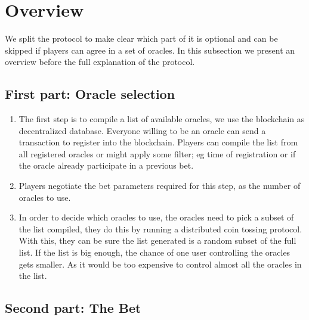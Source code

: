 \section{Overview}

We split the protocol to make clear which part of it is optional and can be
  skipped if players can agree in a set of oracles.
In this subsection we present an overview before the full explanation of the
  protocol.

\subsection{First part: Oracle selection}

\begin{enumerate}
  \item The first step is to compile a list of available oracles, we use the
      blockchain as decentralized database.
      Everyone willing to be an oracle can send a transaction to register into
      the blockchain.
      Players can compile the list from all registered oracles or might apply
      some filter; eg time of registration or if the oracle already participate
      in a previous bet.
  \item Players negotiate the bet parameters required for this step, as the
      number of oracles to use.
  \item In order to decide which oracles to use, the oracles need to pick a
      subset of the list compiled, they do this by running a distributed
      coin tossing protocol.
    With this, they can be sure the list generated is a random subset of the
      full list. If the list is big enough, the chance of one user controlling
      the oracles gets smaller. As it would be too expensive to control almost
      all the oracles in the list.
\end{enumerate}

\subsection{Second part: The Bet}

